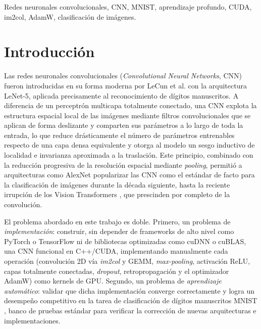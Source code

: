 \documentclass[conference]{IEEEtran}
\begin{document}
\IEEEoverridecommandlockouts
\begin{IEEEkeywords}
Redes neuronales convolucionales, CNN, MNIST, aprendizaje profundo, CUDA, im2col, AdamW, clasificación de imágenes.
\end{IEEEkeywords}

\IEEEpeerreviewmaketitle


\section{Introducción}

Las redes neuronales convolucionales (\emph{Convolutional Neural Networks}, CNN) fueron introducidas en su forma moderna por LeCun et al. \cite{lecun1998mnist} con la arquitectura LeNet-5, aplicada precisamente al reconocimiento de dígitos manuscritos. A diferencia de un perceptrón multicapa totalmente conectado, una CNN explota la estructura espacial local de las imágenes mediante filtros convolucionales que se aplican de forma deslizante y comparten sus parámetros a lo largo de toda la entrada, lo que reduce drásticamente el número de parámetros entrenables respecto de una capa densa equivalente y otorga al modelo un sesgo inductivo de localidad e invarianza aproximada a la traslación. Este principio, combinado con la reducción progresiva de la resolución espacial mediante \emph{pooling}, permitió a arquitecturas como AlexNet \cite{krizhevsky2012imagenet} popularizar las CNN como el estándar de facto para la clasificación de imágenes durante la década siguiente, hasta la reciente irrupción de los Vision Transformers \cite{dosovitskiy2020image}, que prescinden por completo de la convolución.

El problema abordado en este trabajo es doble. Primero, un problema de \emph{implementación}: construir, sin depender de frameworks de alto nivel como PyTorch o TensorFlow ni de bibliotecas optimizadas como cuDNN o cuBLAS, una CNN funcional en C++/CUDA, implementando manualmente cada operación (convolución 2D vía \emph{im2col} y GEMM, \emph{max-pooling}, activación ReLU, capas totalmente conectadas, \emph{dropout}, retropropagación y el optimizador AdamW) como kernels de GPU. Segundo, un problema de \emph{aprendizaje automático}: validar que dicha implementación converge correctamente y logra un desempeño competitivo en la tarea de clasificación de dígitos manuscritos MNIST \cite{lecun1998mnist}, banco de pruebas estándar para verificar la corrección de nuevas arquitecturas e implementaciones.
\end{document}
